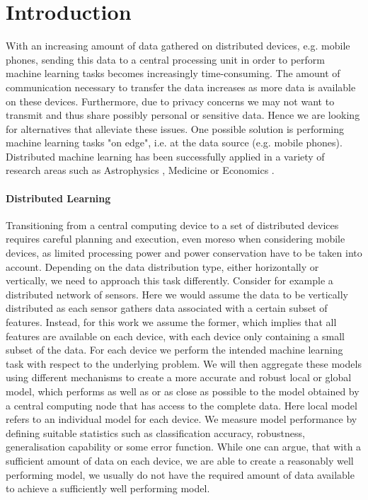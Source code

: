   \section{Introduction}
  With an increasing amount of data gathered on distributed devices, e.g. mobile phones, sending this data to a central processing unit in order to perform machine learning tasks becomes increasingly time-consuming.
  The amount of communication necessary to transfer the data increases as more data is available on these devices.
  Furthermore, due to privacy concerns we may not want to transmit and thus share possibly personal or sensitive data.
  Hence we are looking for alternatives that alleviate these issues.
  One possible solution is performing machine learning tasks "on edge", i.e. at the data source (e.g. mobile phones).
  Distributed machine learning has been successfully applied in a variety of research areas such as Astrophysics \cite{panousopoulou2017distributed}, Medicine \cite{deist2017infrastructure} or Economics \cite{kreitlein2015green}.

  \paragraph{Distributed Learning}

  Transitioning from a central computing device to a set of distributed devices requires careful planning and execution, even moreso when considering mobile devices, as limited processing power and power conservation have to be taken into account.
  Depending on the data distribution type, either horizontally or vertically, we need to approach this task differently. 
  Consider for example a distributed network of sensors.
  Here we would assume the data to be vertically distributed as each sensor gathers data associated with a certain subset of features.
  Instead, for this work we assume the former, which implies that all features are available on each device, with each device only containing a small subset of the data.
  For each device we perform the intended machine learning task with respect to the underlying problem.
  We will then aggregate these models using different mechanisms to create a more accurate and robust local or global model, which performs as well as or as close as possible to the model obtained by a central computing node that has access to the complete data.
  Here local model refers to an individual model for each device.
  We measure model performance by defining suitable statistics such as classification accuracy, robustness, generalisation capability or some error function.
  While one can argue, that with a sufficient amount of data on each device, we are able to create a reasonably well performing model, we usually do not have the required amount of data available to achieve a sufficiently well performing model.
    
